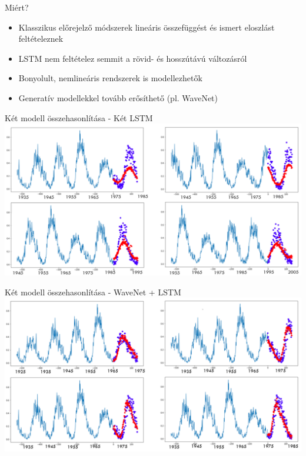 \begin{frame}{Miért?}
    \begin{itemize}
        \item Klasszikus előrejelző módszerek lineáris összefüggést és ismert eloszlást feltételeznek
        \item LSTM nem feltételez semmit a rövid- és hosszútávú változásról
        \item Bonyolult, nemlineáris rendszerek is modellezhetők
        \item Generatív modellekkel tovább erősíthető (pl. WaveNet)
    \end{itemize}
\end{frame}

\begin{frame}{Két modell összehasonlítása - Két LSTM}
    \centering
    \includegraphics[width=1.0\textwidth]{figures/solar_cycle_stacked_lstm.png}
\end{frame}

\begin{frame}{Két modell összehasonlítása - WaveNet + LSTM}
    \centering
    \includegraphics[width=1.0\textwidth]{figures/solar_cycle_wavenet_lstm.png}
\end{frame}

